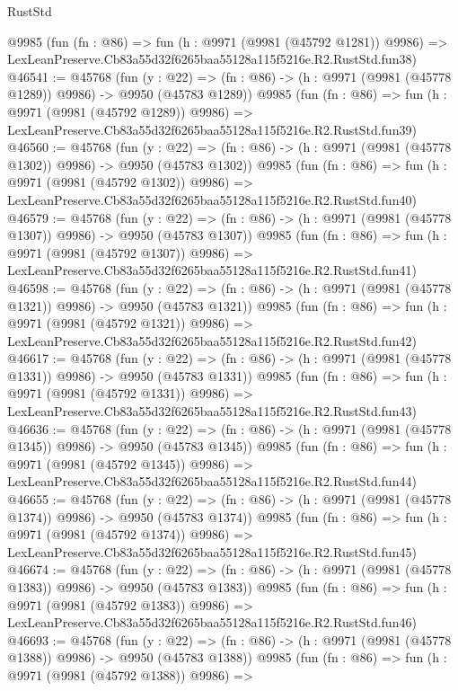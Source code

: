 \begin{lexlean}{RustStd}
\begin{coremodule}
    @9985
    (fun (fn : @86) =>
    fun (h : @9971 (@9981 (@45792 @1281)) @9986) =>
    LexLeanPreserve.Cb83a55d32f6265baa55128a115f5216e.R2.RustStd.fun38)
@46541 := @45768
    (fun (y : @22) =>
    (fn : @86) -> (h : @9971 (@9981 (@45778 @1289)) @9986) -> @9950 (@45783 @1289))
    @9985
    (fun (fn : @86) =>
    fun (h : @9971 (@9981 (@45792 @1289)) @9986) =>
    LexLeanPreserve.Cb83a55d32f6265baa55128a115f5216e.R2.RustStd.fun39)
@46560 := @45768
    (fun (y : @22) =>
    (fn : @86) -> (h : @9971 (@9981 (@45778 @1302)) @9986) -> @9950 (@45783 @1302))
    @9985
    (fun (fn : @86) =>
    fun (h : @9971 (@9981 (@45792 @1302)) @9986) =>
    LexLeanPreserve.Cb83a55d32f6265baa55128a115f5216e.R2.RustStd.fun40)
@46579 := @45768
    (fun (y : @22) =>
    (fn : @86) -> (h : @9971 (@9981 (@45778 @1307)) @9986) -> @9950 (@45783 @1307))
    @9985
    (fun (fn : @86) =>
    fun (h : @9971 (@9981 (@45792 @1307)) @9986) =>
    LexLeanPreserve.Cb83a55d32f6265baa55128a115f5216e.R2.RustStd.fun41)
@46598 := @45768
    (fun (y : @22) =>
    (fn : @86) -> (h : @9971 (@9981 (@45778 @1321)) @9986) -> @9950 (@45783 @1321))
    @9985
    (fun (fn : @86) =>
    fun (h : @9971 (@9981 (@45792 @1321)) @9986) =>
    LexLeanPreserve.Cb83a55d32f6265baa55128a115f5216e.R2.RustStd.fun42)
@46617 := @45768
    (fun (y : @22) =>
    (fn : @86) -> (h : @9971 (@9981 (@45778 @1331)) @9986) -> @9950 (@45783 @1331))
    @9985
    (fun (fn : @86) =>
    fun (h : @9971 (@9981 (@45792 @1331)) @9986) =>
    LexLeanPreserve.Cb83a55d32f6265baa55128a115f5216e.R2.RustStd.fun43)
@46636 := @45768
    (fun (y : @22) =>
    (fn : @86) -> (h : @9971 (@9981 (@45778 @1345)) @9986) -> @9950 (@45783 @1345))
    @9985
    (fun (fn : @86) =>
    fun (h : @9971 (@9981 (@45792 @1345)) @9986) =>
    LexLeanPreserve.Cb83a55d32f6265baa55128a115f5216e.R2.RustStd.fun44)
@46655 := @45768
    (fun (y : @22) =>
    (fn : @86) -> (h : @9971 (@9981 (@45778 @1374)) @9986) -> @9950 (@45783 @1374))
    @9985
    (fun (fn : @86) =>
    fun (h : @9971 (@9981 (@45792 @1374)) @9986) =>
    LexLeanPreserve.Cb83a55d32f6265baa55128a115f5216e.R2.RustStd.fun45)
@46674 := @45768
    (fun (y : @22) =>
    (fn : @86) -> (h : @9971 (@9981 (@45778 @1383)) @9986) -> @9950 (@45783 @1383))
    @9985
    (fun (fn : @86) =>
    fun (h : @9971 (@9981 (@45792 @1383)) @9986) =>
    LexLeanPreserve.Cb83a55d32f6265baa55128a115f5216e.R2.RustStd.fun46)
@46693 := @45768
    (fun (y : @22) =>
    (fn : @86) -> (h : @9971 (@9981 (@45778 @1388)) @9986) -> @9950 (@45783 @1388))
    @9985
    (fun (fn : @86) =>
    fun (h : @9971 (@9981 (@45792 @1388)) @9986) =>

\end{coremodule}
\end{lexlean}
